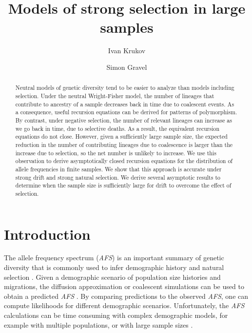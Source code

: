 \documentclass[review]{elsarticle}
\begin{document}
\begin{frontmatter}
  \title{Models of strong selection in large samples}

  \author{Ivan Krukov}
  \author{Simon Gravel}

  \begin{abstract}
    
    Neutral models of genetic diversity tend to be easier to analyze than models including
    selection. Under the neutral Wright-Fisher model, the number of lineages that contribute to
    ancestry of a sample decreases back in time due to coalescent events. As a consequence, useful
    recursion equations can be derived for patterns of polymorphism. By contrast, under negative
    selection, the number of relevant lineages can increase as we go back in time, due to selective
    deaths. As a result, the equivalent recursion equations do not close. However, given a
    sufficiently large sample size, the expected reduction in the number of contributing lineages
    due to coalescence is larger than the increase due to selection, so the net number is unlikely
    to increase. We use this observation to derive asymptotically closed recursion equations for the
    distribution of allele frequencies in finite samples. We show that this approach is accurate
    under strong drift and strong natural selection. We derive several asymptotic results to
    determine when the sample size is sufficiently large for drift to overcome the effect of
    selection.
  \end{abstract}

\end{frontmatter}

\section{Introduction}
\label{sec:introduciton}

The allele frequency spectrum (\textit{AFS}) is an important summary of genetic diversity that is
commonly used to infer demographic history and natural selection \citep{}. Given a demographic
scenario of population size histories and migrations, the diffusion approximation or coalescent
simulations can be used to obtain a predicted \textit{AFS} \citep{}. By comparing
predictions to the observed \textit{AFS}, one can compute likelihoods for different demographic
scenarios. Unfortunately, the \textit{AFS} calculations can be time consuming with complex
demographic models, for example with multiple populations, or with large sample sizes \citep{}.
\end{document}
